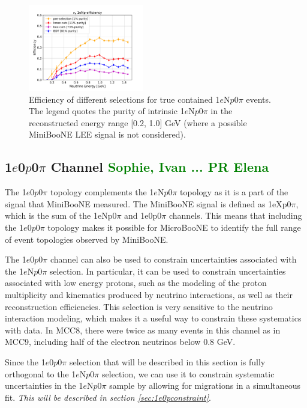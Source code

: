 \documentclass[a4paper]{article}
\newcommand{\npsel}{1$e$N$p$0$\pi$ }
\newcommand{\zpsel}{1$e$0$p$0$\pi$ }
\begin{document}
\begin{figure}[H]
\begin{center}
\includegraphics[width=0.45\textwidth]{1eNp/effpur_1eNp_cut_bdt.pdf}
\caption{\label{fig:1eNp:effpur:RUN1} Efficiency of different selections for true contained \npsel events. The legend quotes the purity of intrinsic \npsel in the reconstructed energy range [0.2, 1.0] \si{\GeV} (where a possible MiniBooNE LEE signal is not considered).}
\end{center}
\end{figure}

\subsection{1$e$0$p$0$\pi$ Channel \textcolor{green}{Sophie, Ivan ... PR Elena}}
\label{sec:nueselection:1e0p}

The \zpsel topology complements the \npsel topology as it is a part of the signal that MiniBooNE measured. The MiniBooNE signal is defined as 1eXp0$\pi$, which is the sum of the 1eNp0$\pi$ and 1e0p0$\pi$ channels. This means that including the \zpsel topology makes it possible for MicroBooNE to identify the full range of event topologies observed by MiniBooNE.    

The \zpsel channel can also be used to constrain uncertainties associated with the \npsel selection.  In particular, it can be used to constrain uncertainties associated with low energy protons, such as the modeling of the proton multiplicity and kinematics produced by neutrino interactions, as well as their reconstruction efficiencies.  This selection is very sensitive to the neutrino interaction modeling, which makes it a useful way to constrain these systematics with data.  In MCC8, there were twice as many events in this channel as in MCC9, including half of the  electron neutrinos below 0.8 GeV.

Since the \zpsel selection that will be described in this section is fully orthogonal to the \npsel selection, we can use it to constrain systematic uncertainties in the \npsel sample by allowing for migrations in a simultaneous fit. \emph{This will be described in section \ref{sec:1e0pconstraint}}.
\end{document}
